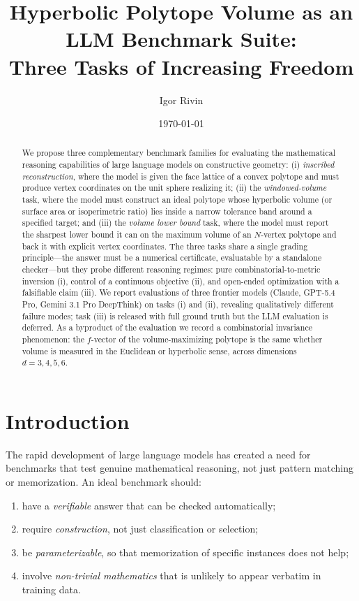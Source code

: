 \documentclass[11pt]{article}
\title{Hyperbolic Polytope Volume as an LLM Benchmark Suite:\\
Three Tasks of Increasing Freedom}
\author{Igor Rivin}
\date{\today}
\begin{document}
\maketitle

\begin{abstract}
We propose three complementary benchmark families for evaluating the
mathematical reasoning capabilities of large language models on
constructive geometry: (i) \emph{inscribed reconstruction}, where the
model is given the face lattice of a convex polytope and must produce
vertex coordinates on the unit sphere realizing it; (ii) the
\emph{windowed-volume} task, where the model must construct an ideal
polytope whose hyperbolic volume (or surface area or isoperimetric
ratio) lies inside a narrow tolerance band around a specified target;
and (iii) the \emph{volume lower bound} task, where the model must
report the sharpest lower bound it can on the maximum volume of an
$N$-vertex polytope and back it with explicit vertex coordinates.
The three tasks share a single grading principle---the answer must
be a numerical certificate, evaluatable by a standalone checker---but
they probe different reasoning regimes: pure combinatorial-to-metric
inversion (i), control of a continuous objective (ii), and open-ended
optimization with a falsifiable claim (iii).  We report evaluations of
three frontier models (Claude, GPT-5.4 Pro, Gemini 3.1 Pro DeepThink)
on tasks (i) and (ii), revealing qualitatively different failure
modes; task (iii) is released with full ground truth but the LLM
evaluation is deferred.  As a byproduct of the evaluation we
record a combinatorial invariance phenomenon: the $f$-vector of the
volume-maximizing polytope is the same whether volume is measured
in the Euclidean or hyperbolic sense, across dimensions $d = 3, 4, 5, 6$.
\end{abstract}

\section{Introduction}

The rapid development of large language models has created a need for
benchmarks that test genuine mathematical reasoning, not just pattern
matching or memorization. An ideal benchmark should:
\begin{enumerate}[label=(\roman*)]
\item have a \emph{verifiable} answer that can be checked automatically;
\item require \emph{construction}, not just classification or selection;
\item be \emph{parameterizable}, so that memorization of specific instances
      does not help;
\item involve \emph{non-trivial mathematics} that is unlikely to appear
      verbatim in training data.
\end{enumerate}
\end{document}
